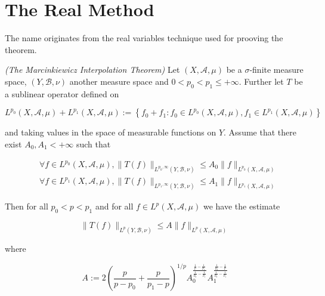 \section{The Real Method}
The name originates from the real variables technique used for prooving the theorem.
\vspace{2mm}
\begin{mdframed}
	\begin{theorem}\emph{(The Marcinkiewicz Interpolation Theorem)}
		Let $(X,\mathcal{A},\mu)$ be a $\sigma$-finite measure space, $(Y,\mathcal{B},\nu)$ another measure space and $0 < p_0 < p_1 \leqslant + \infty$. Further let $T$ be a sublinear operator defined on
		
		\begin{equation*}
			L^{p_0}(X,\mathcal{A},\mu) + L^{p_1}(X,\mathcal{A},\mu) := \left\{ f_0 + f_1 : f_0 \in L^{p_0}(X,\mathcal{A},\mu), f_1 \in L^{p_1}(X,\mathcal{A},\mu) \right\}
		\end{equation*}
		
		and taking values in the space of measurable functions on $Y$. Assume that there exist $A_0,A_1 < + \infty$ such that

		\begin{align}
			&\forall f \in L^{p_0}(X,\mathcal{A},\mu), \|T(f)\|_{L^{p_0,\infty}(Y,\mathcal{B},\nu)} \leqslant A_0 \|f\|_{L^{p_0}(X,\mathcal{A},\mu)}\\
			&\forall f \in L^{p_1}(X,\mathcal{A},\mu), \|T(f)\|_{L^{p_1,\infty}(Y,\mathcal{B},\nu)} \leqslant A_1 \|f\|_{L^{p_1}(X,\mathcal{A},\mu)}
		\end{align}

		Then for all $p_0 < p < p_1$ and for all $f \in L^p(X,\mathcal{A},\mu)$ we have the estimate

		\begin{equation}
			\|T(f)\|_{L^p(Y,\mathcal{B},\nu)} \leqslant A \|f\|_{L^p(X,\mathcal{A},\mu)}
		\end{equation}

		where

		\begin{equation}
			A := 2\left( \frac{p}{p - p_0} + \frac{p}{p_1 - p} \right)^{1/p}A_0^{\frac{\frac{1}{p} - \frac{1}{p_1}}{\frac{1}{p_0}-\frac{1}{p_1}}}A_1^{\frac{\frac{1}{p_0}-\frac{1}{p}}{\frac{1}{p_0}-\frac{1}{p_1}}}
			\label{eq:constant}
		\end{equation}
	\end{theorem}
\end{mdframed}

